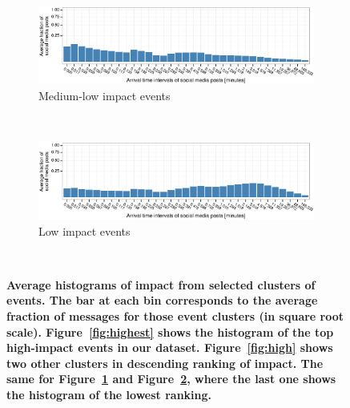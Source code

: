 \documentclass[10pt,letterpaper]{article}
\begin{document}
\begin{figure}
  \begin{subfigure}[b]{0.5\textwidth}
    \includegraphics[width=\textwidth]{figures_SI/Plots_from_data/avg_hist_11_9}
    \caption{Medium-low impact events}
    \label{fig:med}
  \end{subfigure}%
  ~
  \begin{subfigure}[b]{0.5\textwidth}
    \includegraphics[width=\textwidth]{figures_SI/Plots_from_data/avg_hist_0_1}
    \caption{Low impact events}
    \label{fig:low}
  \end{subfigure}%
  ~
  \caption{\textbf{Average histograms of impact from selected clusters
      of events. The bar at each bin corresponds to the average
      fraction of messages for those event clusters (in square root
      scale). Figure~\ref{fig:highest} shows the histogram of the top
      high-impact events in our dataset. Figure~\ref{fig:high} shows
      two other clusters in descending ranking of impact. The same for
      Figure~\ref{fig:med} and Figure~\ref{fig:low}, where the last
      one shows the histogram of the lowest
      ranking.}}\label{fig:histograms}
\end{figure}

\end{document}
